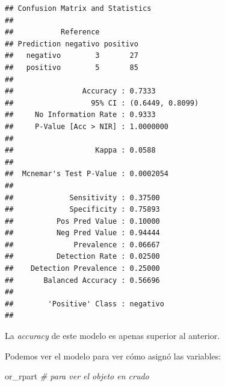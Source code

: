 \documentclass[
]{book}
\newenvironment{Shaded}{\begin{snugshade}}{\end{snugshade}}
\newcommand{\AttributeTok}[1]{\textcolor[rgb]{0.77,0.63,0.00}{#1}}
\newcommand{\CommentTok}[1]{\textcolor[rgb]{0.56,0.35,0.01}{\textit{#1}}}
\newcommand{\FunctionTok}[1]{\textcolor[rgb]{0.00,0.00,0.00}{#1}}
\newcommand{\NormalTok}[1]{#1}
\newcommand{\OtherTok}[1]{\textcolor[rgb]{0.56,0.35,0.01}{#1}}
\newcommand{\SpecialCharTok}[1]{\textcolor[rgb]{0.00,0.00,0.00}{#1}}
\newcommand{\StringTok}[1]{\textcolor[rgb]{0.31,0.60,0.02}{#1}}
\begin{document}
\begin{Shaded}
\end{Shaded}

\begin{verbatim}
## Confusion Matrix and Statistics
## 
##           Reference
## Prediction negativo positivo
##   negativo        3       27
##   positivo        5       85
##                                           
##                Accuracy : 0.7333          
##                  95% CI : (0.6449, 0.8099)
##     No Information Rate : 0.9333          
##     P-Value [Acc > NIR] : 1.0000000       
##                                           
##                   Kappa : 0.0588          
##                                           
##  Mcnemar's Test P-Value : 0.0002054       
##                                           
##             Sensitivity : 0.37500         
##             Specificity : 0.75893         
##          Pos Pred Value : 0.10000         
##          Neg Pred Value : 0.94444         
##              Prevalence : 0.06667         
##          Detection Rate : 0.02500         
##    Detection Prevalence : 0.25000         
##       Balanced Accuracy : 0.56696         
##                                           
##        'Positive' Class : negativo        
## 
\end{verbatim}

La \emph{accuracy} de este modelo es apenas superior al anterior.

Podemos ver el modelo para ver cómo asignó las variables:

\begin{Shaded}
\begin{Highlighting}[]
\NormalTok{or\_rpart }\CommentTok{\# para ver el objeto en crudo}
\end{Highlighting}
\end{Shaded}
\end{document}
